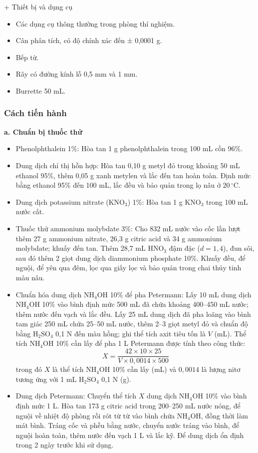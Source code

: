 + Thiết bị và dụng cụ 
\begin{itemize}
  \item Các dụng cụ thông thường trong phòng thí nghiệm.
  \item Cân phân tích, có độ chính xác đến ± 0,0001 g.
  \item Bếp từ.
  \item Rây có đường kính lỗ 0,5 mm và 1 mm.
  \item Burrette 50 mL.
\end{itemize}

\subsubsection{Cách tiến hành}
\noindent\textbf{a. Chuẩn bị thuốc thử}
\begin{itemize}
  \item Phenolphthalein 1\%: Hòa tan 1 g phenolphthalein trong 100 mL cồn 96\%.
  \item Dung dịch chỉ thị hỗn hợp: Hòa tan 0,10 g metyl đỏ trong khoảng 50 mL ethanol 95\%, thêm 0,05 g xanh metylen và lắc đến tan hoàn toàn. 
  Định mức bằng ethanol 95\% đến 100 mL, lắc đều và bảo quản trong lọ nâu ở $20\,^{\circ}\mathrm{C}$.
  \item Dung dịch potassium nitrate (\(\mathrm{KNO_3}\)) 1\%: Hòa tan 1 g \(\mathrm{KNO_3}\) trong 100 mL nước cất.
  \item Thuốc thử ammonium molybdate 3\%: Cho 832 mL nước vào cốc lần lượt thêm 27 g ammonium nitrate, 26,3 g citric acid và 34 g ammonium molybdate; khuấy đến tan. 
  Thêm 28,7 mL \(\mathrm{HNO_3}\) đậm đặc ($d=1{,}4$), đun sôi, sau đó thêm 2 giọt dung dịch diammonium phosphate 10\%.
  Khuấy đều, để nguội, để yên qua đêm, lọc qua giấy lọc và bảo quản trong chai thủy tinh màu nâu.
  \item Chuẩn hóa dung dịch \(\mathrm{NH_4OH}\) 10\% để pha Petermann: Lấy 10 mL dung dịch \(\mathrm{NH_4OH}\) 10\% vào bình định mức 500 mL đã chứa khoảng 400--450 mL nước; thêm nước đến vạch và lắc đều.
  Lấy 25 mL dung dịch đã pha loãng vào bình tam giác 250 mL chứa 25--50 mL nước, thêm 2--3 giọt metyl đỏ và chuẩn độ bằng \(\mathrm{H_2SO_4}\) 0,1 N đến màu hồng; ghi thể tích axit tiêu tốn là $V$ (mL). Thể tích \(\mathrm{NH_4OH}\) 10\% cần lấy để pha 1 L Petermann được tính theo công thức:
  \[
    X = \frac{42 \times 10 \times 25}{V \times 0{,}0014 \times 500}
  \]
  trong đó $X$ là thể tích \(\mathrm{NH_4OH}\) 10\% cần lấy (mL) và $0{,}0014$ là lượng nitơ tương ứng với 1 mL \(\mathrm{H_2SO_4}\) 0,1 N (g).
  \item Dung dịch Petermann: Chuyển thể tích $X$ dung dịch \(\mathrm{NH_4OH}\) 10\% vào bình định mức 1 L. Hòa tan 173 g citric acid trong 200--250 mL nước nóng, để nguội về nhiệt độ phòng rồi rót từ từ vào bình chứa \(\mathrm{NH_4OH}\), đồng thời làm mát bình. Tráng cốc và phễu bằng nước, chuyển nước tráng vào bình, để nguội hoàn toàn, thêm nước đến vạch 1 L và lắc kỹ. Để dung dịch ổn định trong 2 ngày trước khi sử dụng.
\end{itemize}

